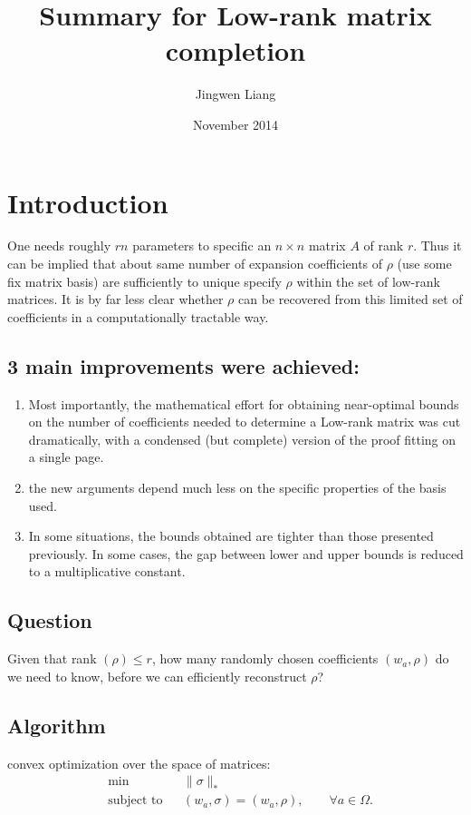 \documentclass{article}
\title{Summary for Low-rank matrix completion}
\author{Jingwen Liang}
\date{November 2014}
\begin{document}
\maketitle

\section{Introduction}
One needs roughly $rn$ parameters to specific an $n\times n$ matrix $A$ of rank $r$. Thus it can be implied that about same number of expansion coefficients of $\rho$ (use some fix matrix basis) are sufficiently to unique specify $\rho$ within the set of low-rank matrices. It is by far less clear whether $\rho$ can be recovered from this limited set of coefficients in a computationally tractable way. 

\subsection{3 main improvements were achieved:}
\begin{enumerate}
\item Most importantly, the mathematical effort for obtaining {\color{red}near-optimal bounds} on the number of coefficients needed to determine a Low-rank matrix was {\color{blue}cut dramatically}, with a {\color{blue}condensed (but complete) version of the proof} fitting on a single page.

\item the new arguments depend much less on the specific properties of the basis used.

\item In some situations, {\color{blue}the bounds obtained are tighter than those presented previously}. In some cases, the gap between lower and upper bounds is reduced to a multiplicative constant.


\end{enumerate}

\subsection{Question}
Given that rank $ (\rho) \le r $,
how many randomly chosen coefficients $(w_a,\rho)$ do we need to know, before we can efficiently reconstruct $\rho$?
\subsection{Algorithm}
convex optimization over the space of matrices:
\begin{equation}
\begin{aligned}
& {\text{min}}
& & \| \sigma \|_* \\
& \text{subject to}
& & ( w_a,\sigma) = (w_a, \rho) , \qquad \forall a \in \Omega.
\end{aligned}
\end{equation}
\end{document}
